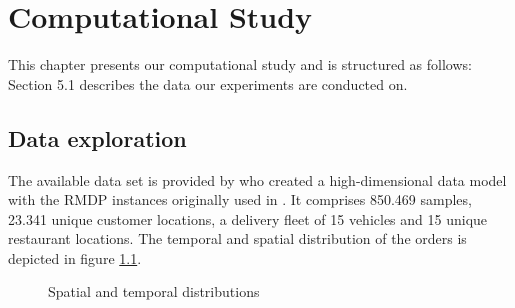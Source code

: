 \chapter{Computational Study}

This chapter presents our computational study and is structured as follows: Section 5.1 describes the data our experiments are conducted on.  
\section{Data exploration}

The available data set is provided by \cite{Hildebrandt2020_EAT} who created a high-dimensional data model with the RMDP instances originally used in \cite{UlmerRMDP}. It comprises 850.469 samples, 23.341 unique customer locations, a delivery fleet of 15 vehicles and 15 unique restaurant locations. The temporal and spatial distribution of the orders is depicted in figure \ref{fig:dists}. 
\begin{figure}[h]
	\centering
	\caption{Spatial and temporal distributions}
	\label{fig:dists}
\end{figure}

